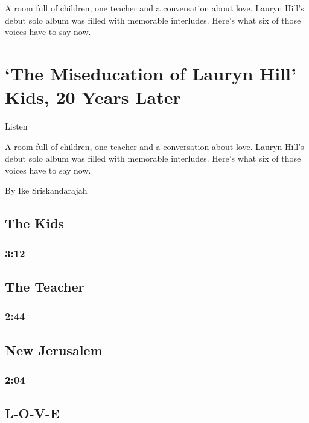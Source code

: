 A room full of children, one teacher and a conversation about love.
Lauryn Hill's debut solo album was filled with memorable interludes.
Here's what six of those voices have to say now.

\hypertarget{the-miseducation-of-lauryn-hill-kids-20-years-later-1}{%
\section{`The Miseducation of Lauryn Hill' Kids, 20 Years
Later}\label{the-miseducation-of-lauryn-hill-kids-20-years-later-1}}

Listen

A room full of children, one teacher and a conversation about love.
Lauryn Hill's debut solo album was filled with memorable interludes.
Here's what six of those voices have to say now.

By Ike Sriskandarajah

\hypertarget{the-kids}{%
\subsection{The Kids}\label{the-kids}}

\hypertarget{312}{%
\subsubsection{3:12}\label{312}}

\hypertarget{the-teacher}{%
\subsection{The Teacher}\label{the-teacher}}

\hypertarget{244}{%
\subsubsection{2:44}\label{244}}

\hypertarget{new-jerusalem}{%
\subsection{New Jerusalem}\label{new-jerusalem}}

\hypertarget{204}{%
\subsubsection{2:04}\label{204}}

\hypertarget{l-o-v-e}{%
\subsection{L-O-V-E}\label{l-o-v-e}}

